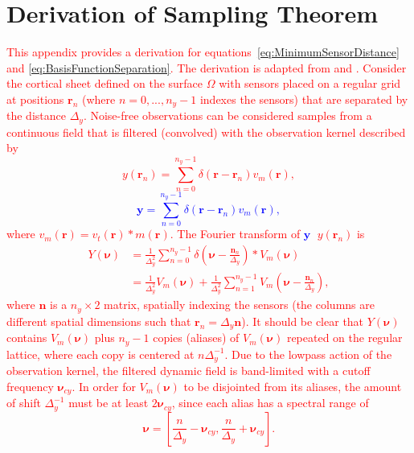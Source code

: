 \documentclass[review,authoryear,3p]{elsarticle}
\newcommand{\dean}[1]{\textcolor{red}{#1}}
\newcommand{\parham}[1]{\textsf{\emph{\textbf{\textcolor{blue}{#1}}}}}
\begin{document}
\section{Derivation of Sampling Theorem}\label{App:SamplingTheorem}
\dean{This appendix provides a derivation for equations~\ref{eq:MinimumSensorDistance} and \ref{eq:BasisFunctionSeparation}. The derivation is adapted from \citet{Sanner1992} and \citet{Scerri2009}. Consider the cortical sheet defined on the surface $\Omega$ with sensors placed on a regular grid at positions $\mathbf{r}_n$ (where $n=0,...,n_y-1$ indexes the sensors) that are separated by the distance $\Delta_y$. Noise-free observations can be considered samples from a continuous field that is filtered (convolved) with the observation kernel described by
\begin{equation}
	y(\mathbf{r}_n)=\sum_{n=0}^{n_y-1}\delta(\mathbf r - \mathbf{r}_n ) v_m(\mathbf{r}),
\end{equation} 
\parham{\begin{equation}
	\mathbf y=\sum_{n=0}^{n_y-1}\delta(\mathbf r - \mathbf{r}_n ) v_m(\mathbf{r}),
\end{equation}}
where $v_m(\mathbf{r}) = v_t(\mathbf{r})\ast m(\mathbf{r})$. The Fourier transform of \parham{$\mathbf y$~}$y(\mathbf{r}_n)$ is
\begin{align}
 Y(\boldsymbol{\nu}) &= \frac{1}{\Delta_y^2}\sum_{n=0}^{n_y-1} \delta\left(\boldsymbol{\nu}-\frac{\mathbf{n}_n}{\Delta_y}\right) \ast V_m(\boldsymbol \nu) \\
	&= \frac{1}{\Delta_y^2}V_m(\boldsymbol\nu) + \frac{1}{\Delta_y^2} \sum_{n=1}^{n_y-1} V_m\left(\boldsymbol{\nu}-\frac{\mathbf{n}_n}{\Delta_y}\right),
\end{align} 
where $\mathbf{n}$ is a $n_y \times 2$ matrix, spatially indexing the sensors (the columns are different spatial dimensions such that $\mathbf{r}_n = \Delta_y \mathbf{n}$). It should be clear that $Y(\boldsymbol{\nu})$ contains $V_m(\boldsymbol\nu)$ plus $n_y-1$ copies (aliases) of $V_m(\boldsymbol\nu)$ repeated on the regular lattice, where each copy is centered at $n\Delta_y^{-1}$. Due to the lowpass action of the observation kernel, the filtered dynamic field is band-limited with a cutoff frequency $\boldsymbol\nu_{cy}$. In order for $V_m(\boldsymbol\nu)$ to be disjointed from its aliases, the amount of shift $\Delta_y^{-1}$ must be at least $2\boldsymbol\nu_{cy}$, since each alias has a spectral range of
\begin{equation}
	\boldsymbol\nu = \left[\frac{n}{\Delta_y}-\boldsymbol{\nu}_{cy},\frac{n}{\Delta_y}+\boldsymbol{\nu}_{cy}\right].

\end{equation}}
\end{document}
